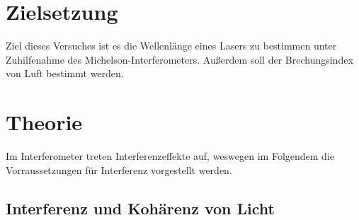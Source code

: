 \section{Zielsetzung}
\label{Zielsetzung}
Ziel dieses Versuches ist es die Wellenlänge eines Lasers zu bestimmen unter Zuhilfenahme des Michelson-Interferometers.
Außerdem soll der Brechungsindex von Luft bestimmt werden.

\section{Theorie}
\label{sec:Theorie}
Im Interferometer treten Interferenzeffekte auf, weswegen im Folgendem die Vorraussetzungen für Interferenz vorgestellt werden.

\subsection{Interferenz und Kohärenz von Licht}
\label{Int&Ko_theo}

